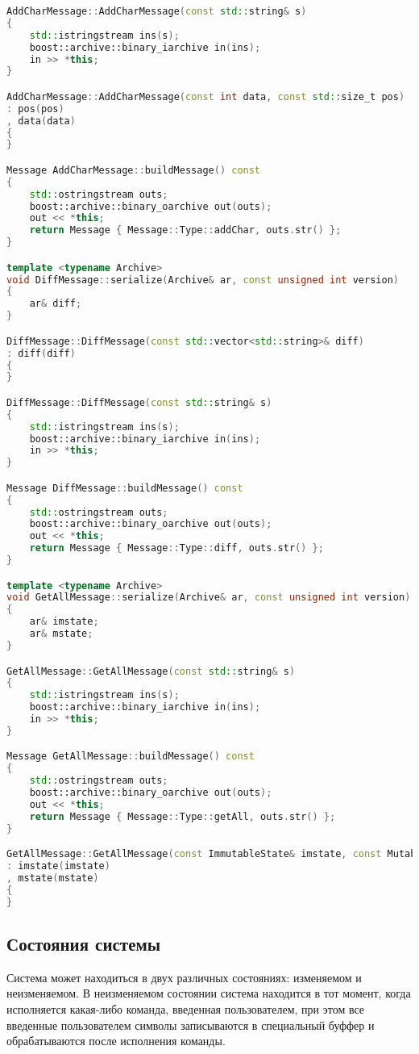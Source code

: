 \begin{lstlisting}[label=lst:message-struct,caption=Базовые структуры\, описывающие сообщение,language=c++]
AddCharMessage::AddCharMessage(const std::string& s)
{
	std::istringstream ins(s);
	boost::archive::binary_iarchive in(ins);
	in >> *this;
}

AddCharMessage::AddCharMessage(const int data, const std::size_t pos)
: pos(pos)
, data(data)
{
}

Message AddCharMessage::buildMessage() const
{
	std::ostringstream outs;
	boost::archive::binary_oarchive out(outs);
	out << *this;
	return Message { Message::Type::addChar, outs.str() };
}

template <typename Archive>
void DiffMessage::serialize(Archive& ar, const unsigned int version)
{
	ar& diff;
}

DiffMessage::DiffMessage(const std::vector<std::string>& diff)
: diff(diff)
{
}

DiffMessage::DiffMessage(const std::string& s)
{
	std::istringstream ins(s);
	boost::archive::binary_iarchive in(ins);
	in >> *this;
}

Message DiffMessage::buildMessage() const
{
	std::ostringstream outs;
	boost::archive::binary_oarchive out(outs);
	out << *this;
	return Message { Message::Type::diff, outs.str() };
}

template <typename Archive>
void GetAllMessage::serialize(Archive& ar, const unsigned int version)
{
	ar& imstate;
	ar& mstate;
}

GetAllMessage::GetAllMessage(const std::string& s)
{
	std::istringstream ins(s);
	boost::archive::binary_iarchive in(ins);
	in >> *this;
}

Message GetAllMessage::buildMessage() const
{
	std::ostringstream outs;
	boost::archive::binary_oarchive out(outs);
	out << *this;
	return Message { Message::Type::getAll, outs.str() };
}

GetAllMessage::GetAllMessage(const ImmutableState& imstate, const MutableState& mstate)
: imstate(imstate)
, mstate(mstate)
{
}
\end{lstlisting}

\subsection{Состояния системы}

Система может находиться в двух различных состояниях: изменяемом и неизменяемом. В неизменяемом состоянии система находится в тот момент, когда исполняется какая-либо команда, введенная пользователем, при этом все введенные пользователем символы записываются в специальный буффер и обрабатываются после исполнения команды.

